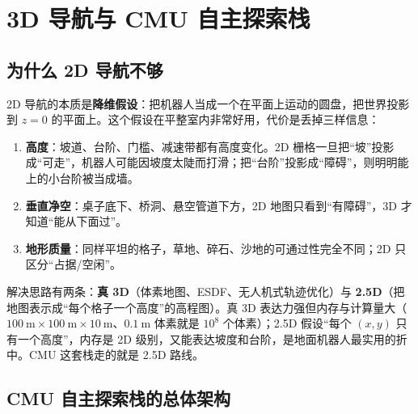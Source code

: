 \chapter{3D 导航与 CMU 自主探索栈}\label{ch:21-3d-nav}

\usetikzlibrary{arrows.meta,positioning,calc,fit,patterns,decorations.pathreplacing}


\section{为什么 2D 导航不够}\label{sec:21-why3d}

2D 导航的本质是\textbf{降维假设}：把机器人当成一个在平面上运动的圆盘，把世界投影到 $z=0$ 的平面上。这个假设在平整室内非常好用，代价是丢掉三样信息：

\begin{enumerate}
  \item \textbf{高度}：坡道、台阶、门槛、减速带都有高度变化。2D 栅格一旦把“坡”投影成“可走”，机器人可能因坡度太陡而打滑；把“台阶”投影成“障碍”，则明明能上的小台阶被当成墙。
  \item \textbf{垂直净空}：桌子底下、桥洞、悬空管道下方，2D 地图只看到“有障碍”，3D 才知道“能从下面过”。
  \item \textbf{地形质量}：同样平坦的格子，草地、碎石、沙地的可通过性完全不同；2D 只区分“占据/空闲”。
\end{enumerate}

解决思路有两条：\textbf{真 3D}（体素地图、ESDF、无人机式轨迹优化）与 \textbf{2.5D}（把地图表示成“每个格子一个高度”的高程图）。真 3D 表达力强但内存与计算量大（$100\ \mathrm{m}\times100\ \mathrm{m}\times10\ \mathrm{m}$、$0.1\ \mathrm{m}$ 体素就是 $10^8$ 个体素）；2.5D 假设“每个 $(x,y)$ 只有一个高度”，内存是 2D 级别，又能表达坡度和台阶，是地面机器人最实用的折中。CMU 这套栈走的就是 2.5D 路线。

\section{CMU 自主探索栈的总体架构}\label{sec:21-arch}

